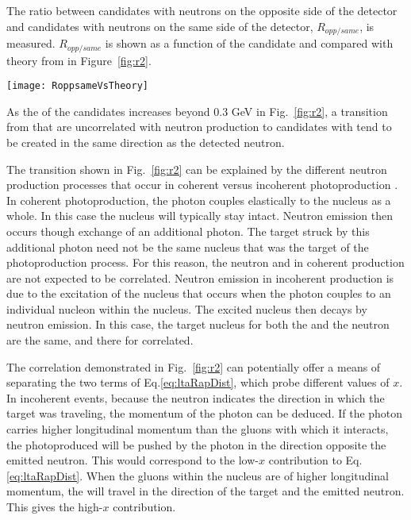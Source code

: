     The ratio between candidates with neutrons on the opposite side of the 
      detector and candidates with neutrons on the same side of the detector,
      $R_{opp/same}$, is measured.
    $R_{opp/same}$ is shown as a function of the candidate \pt{} and compared
      with theory from \cite{Guzey:2013jaa} in Figure~\ref{fig:r2}.
    \begin{figure*}[!Hhtb]
      \begin{center}
        \texttt{[image: RoppsameVsTheory]}
        \caption{\label{fig:r2}Ratio between the transverse momentum 
          distribution of the $J/\psi$ when  $J/\psi$ and neutron have 
          the opposite direction and the transverse momentum distribution 
          of the $J/\psi$ when  $J/\psi$ and neutron have the same direction.}
      \end{center}
    \end{figure*}
    As the \pt{} of the candidates increases beyond 0.3 GeV in Fig.~\ref{fig:r2},
      a transition from \JPsi{} that are uncorrelated with neutron production 
      to \JPsi{} candidates with tend to be created in the same direction as
      the detected neutron. 

    The transition shown in Fig.~\ref{fig:r2} can be explained by the different
      neutron production processes that occur in coherent versus incoherent 
      photoproduction \cite{Strikman:2005ze}.
    In coherent photoproduction, the photon couples elastically to the nucleus 
      as a whole.
    In this case the nucleus will typically stay intact.
    Neutron emission then occurs though exchange of an additional photon. 
    The target struck by this additional photon need not be the same nucleus
      that was the target of the photoproduction process. 
    For this reason, the neutron and \JPsi{} in coherent production are not 
      expected to be correlated.
    Neutron emission in incoherent production is due to the excitation of the 
      nucleus that occurs when the photon couples to an individual nucleon within 
      the nucleus.
    The excited nucleus then decays by neutron emission. 
    In this case, the target nucleus for both the \JPsi{} and the neutron 
       are the same, and there for correlated. 

    The correlation demonstrated in Fig.~\ref{fig:r2} can potentially offer a 
      means of separating the two terms of Eq.\ref{eq:ltaRapDist}, which probe 
      different values of $x$. 
    In incoherent events, because the neutron indicates the direction in which
      the target was traveling, the momentum of the photon can be deduced. 
    If the photon carries higher longitudinal momentum than the gluons with 
      which it interacts, the photoproduced \JPsi{} will be pushed by the 
      photon in the direction opposite the emitted neutron. 
    This would correspond to the low-$x$ contribution to Eq.\ref{eq:ltaRapDist}.
    When the gluons within the nucleus are of higher longitudinal momentum, 
      the \JPsi{} will travel in the direction of the target and the emitted 
      neutron. 
    This gives the high-$x$ contribution. 
    
